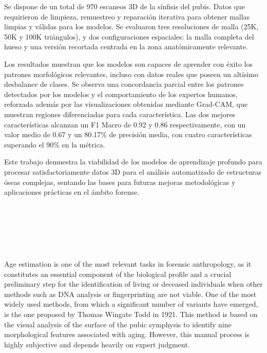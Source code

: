 Se dispone de un total de 970 escaneos 3D de la sínfisis del pubis. Datos que requirieron de limpieza, remuestreo y reparación iterativa para obtener mallas limpias y válidas para los modelos. Se evaluaron tres resoluciones de malla (25K, 50K y 100K triángulos), y dos configuraciones espaciales: la malla completa del hueso y una versión recortada centrada en la zona anatómicamente relevante.

Los resultados muestran que los modelos son capaces de aprender con éxito los patrones morfológicos relevantes, incluso con datos reales que poseen un altísimo desbalance de clases. Se observa una concordancia parcial entre los patrones detectados por los modelos y el comportamiento de los expertos humanos, reforzada además por las visualizaciones obtenidas mediante Grad-CAM, que muestran regiones diferenciadas para cada característica. Las dos mejores características alcanzan un F1 Macro de 0.92 y 0.86 respectivamente, con un valor medio de 0.67 y un 80.17\% de precisión media, con cuatro características superando el 90\% en la métrica.

Este trabajo demuestra la viabilidad de los modelos de aprendizaje profundo para procesar satisfactoriamente datos 3D para el análisis automatizado de estructuras óseas complejas, sentando las bases para futuras mejoras metodológicas y aplicaciones prácticas en el ámbito forense.

\newpage
\thispagestyle{empty}


\begin{center}
{\large\bfseries \myTitleENG} \\
\end{center}
\begin{center}
\myName \\
\end{center}

\vspace{0.7cm}
 \\

\vspace{0.7cm}
 \\

Age estimation is one of the most relevant tasks in forensic anthropology, as it constitutes an essential component of the biological profile and a crucial preliminary step for the identification of living or deceased individuals when other methods such as DNA analysis or fingerprinting are not viable. One of the most widely used methods, from which a significant number of variants have emerged, is the one proposed by Thomas Wingate Todd in 1921. This method is based on the visual analysis of the surface of the pubic symphysis to identify nine morphological features associated with aging. However, this manual process is highly subjective and depends heavily on expert judgment.

